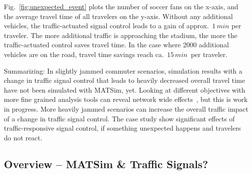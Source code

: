 Fig.~\ref{fig:unexpected_event} plots the number of soccer fans on
the x-axis, and the average travel time of all travelers on the
y-axis. Without any additional vehicles,
the traffic-actuated signal control leads to a gain of
approx.~$1 \, min$ per traveler.
The more additional traffic is approaching the stadium, the more the traffic-actuated control saves travel time. In the case where 2000 additional vehicles are on the road, travel time savings reach ca.~$15\, min$~per traveler. 

Summarizing: In slightly jammed commuter scenarios, simulation results with a change in traffic signal control that leads to heavily decreased overall travel time have not been simulated with MATSim, yet. 
Looking at different objectives with more fine grained analysis tools can reveal network wide effects~\citep[e.g.~see the analysis using macroscopic fundamental diagrams, pp.114]{Grether2014PhD}, but this is work in progress.  
More heavily jammed scenarios can increase the overall traffic impact of a change in traffic signal control. The case study show significant effects of traffic-responsive signal control, if something unexpected happens and travelers do not react.  

\subsection{Overview -- MATSim \& Traffic Signals?}

